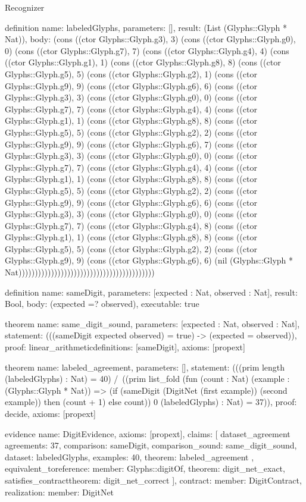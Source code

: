 \begin{lexlean}{Recognizer}
\begin{semanticmodule}
definition{
  name: labeledGlyphs,
  parameters: [],
  result: (List (Glyphs::Glyph * Nat)),
  body: (cons ((ctor Glyphs::Glyph.g3), 3) (cons ((ctor Glyphs::Glyph.g0), 0) (cons ((ctor Glyphs::Glyph.g7), 7) (cons ((ctor Glyphs::Glyph.g4), 4) (cons ((ctor Glyphs::Glyph.g1), 1) (cons ((ctor Glyphs::Glyph.g8), 8) (cons ((ctor Glyphs::Glyph.g5), 5) (cons ((ctor Glyphs::Glyph.g2), 1) (cons ((ctor Glyphs::Glyph.g9), 9) (cons ((ctor Glyphs::Glyph.g6), 6) (cons ((ctor Glyphs::Glyph.g3), 3) (cons ((ctor Glyphs::Glyph.g0), 0) (cons ((ctor Glyphs::Glyph.g7), 7) (cons ((ctor Glyphs::Glyph.g4), 4) (cons ((ctor Glyphs::Glyph.g1), 1) (cons ((ctor Glyphs::Glyph.g8), 8) (cons ((ctor Glyphs::Glyph.g5), 5) (cons ((ctor Glyphs::Glyph.g2), 2) (cons ((ctor Glyphs::Glyph.g9), 9) (cons ((ctor Glyphs::Glyph.g6), 7) (cons ((ctor Glyphs::Glyph.g3), 3) (cons ((ctor Glyphs::Glyph.g0), 0) (cons ((ctor Glyphs::Glyph.g7), 7) (cons ((ctor Glyphs::Glyph.g4), 4) (cons ((ctor Glyphs::Glyph.g1), 1) (cons ((ctor Glyphs::Glyph.g8), 8) (cons ((ctor Glyphs::Glyph.g5), 5) (cons ((ctor Glyphs::Glyph.g2), 2) (cons ((ctor Glyphs::Glyph.g9), 9) (cons ((ctor Glyphs::Glyph.g6), 6) (cons ((ctor Glyphs::Glyph.g3), 3) (cons ((ctor Glyphs::Glyph.g0), 0) (cons ((ctor Glyphs::Glyph.g7), 7) (cons ((ctor Glyphs::Glyph.g4), 8) (cons ((ctor Glyphs::Glyph.g1), 1) (cons ((ctor Glyphs::Glyph.g8), 8) (cons ((ctor Glyphs::Glyph.g5), 5) (cons ((ctor Glyphs::Glyph.g2), 2) (cons ((ctor Glyphs::Glyph.g9), 9) (cons ((ctor Glyphs::Glyph.g6), 6) (nil (Glyphs::Glyph * Nat))))))))))))))))))))))))))))))))))))))))))
}

definition{
  name: sameDigit,
  parameters: [expected : Nat, observed : Nat],
  result: Bool,
  body: (expected =? observed),
  executable: true
}

theorem{
  name: same_digit_sound,
  parameters: [expected : Nat, observed : Nat],
  statement: (((sameDigit expected observed) = true) -> (expected = observed)),
  proof: linear_arithmetic{definitions: [sameDigit]},
  axioms: [propext]
}

theorem{
  name: labeled_agreement,
  parameters: [],
  statement: (((prim length (labeledGlyphs) : Nat) = 40) /\ ((prim list_fold (fun (count : Nat) (example : (Glyphs::Glyph * Nat)) => (if (sameDigit (DigitNet (first example)) (second example)) then (count + 1) else count)) 0 (labeledGlyphs) : Nat) = 37)),
  proof: decide{},
  axioms: [propext]
}

evidence{
  name: DigitEvidence,
  axioms: [propext],
  claims: [
    dataset_agreement{
      agreements: 37,
      comparison: sameDigit,
      comparison_sound: same_digit_sound,
      dataset: labeledGlyphs,
      examples: 40,
      theorem: labeled_agreement
    },
    equivalent_to{reference: {member: Glyphs::digitOf}, theorem: digit_net_exact},
    satisfies_contract{theorem: digit_net_correct}
  ],
  contract: {member: DigitContract},
  realization: {member: DigitNet}
}


\end{semanticmodule}
\end{lexlean}

